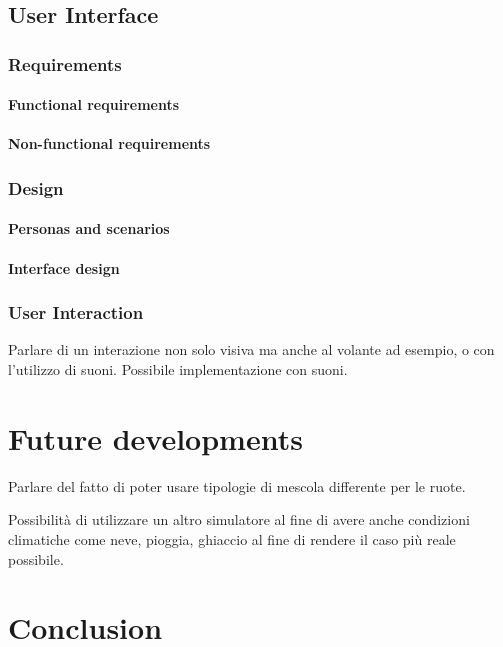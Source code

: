 \documentclass[a4paper,final,12pt]{report}
\begin{document}
\section{User Interface}

\subsection{Requirements}

\subsubsection{Functional requirements}

\subsubsection{Non-functional requirements}

\subsection{Design}

\subsubsection{Personas and scenarios}

\subsubsection{Interface design}

\subsection{User Interaction}
Parlare di un interazione non solo visiva ma anche al volante ad esempio, o con l'utilizzo di suoni. Possibile implementazione con suoni.

\chapter{Future developments}
Parlare del fatto di poter usare tipologie di mescola differente per le ruote.

Possibilità di utilizzare un altro simulatore al fine di avere anche condizioni climatiche come neve, pioggia, ghiaccio al fine di rendere il caso più reale possibile.

\chapter{Conclusion}
\end{document}
